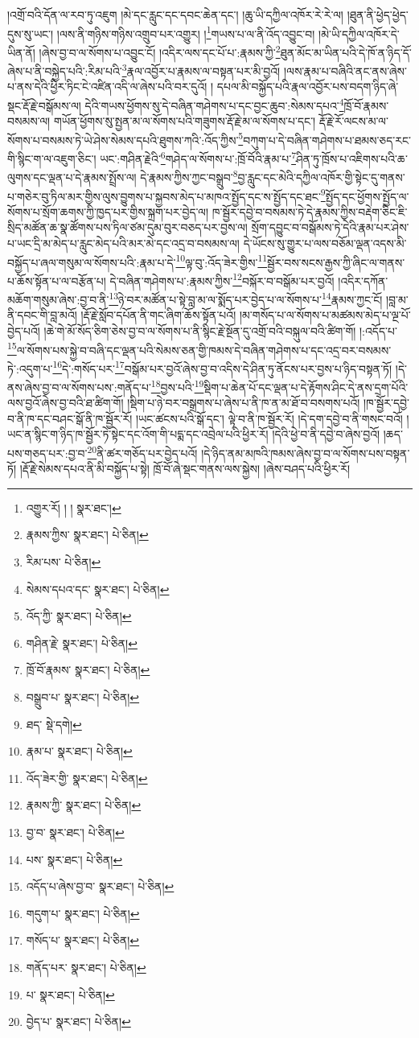 །འགྲོ་བའི་དོན་ལ་རབ་ཏུ་འཇུག །མེ་དང་རླུང་དང་དབང་ཆེན་དང་། །ཆུ་ཡི་དཀྱིལ་འཁོར་རེ་རེ་ལ། །ཐུན་ནི་ཕྱེད་ཕྱེད་དུས་སུ་ཡང་། །ལས་ནི་གཉིས་གཉིས་འགྲུབ་པར་འགྱུར། །\footnote{འགྱུར་རོ། ། །  སྣར་ཐང་། }གཡས་པ་ལ་ནི་འོད་འབྱུང་བ། །མེ་ཡི་དཀྱིལ་འཁོར་དེ་ཡིན་ནོ། །ཞེས་བྱ་བ་ལ་སོགས་པ་འབྱུང་ངོ། །འདིར་ལས་དང་པོ་པ་:རྣམས་ཀྱི་\footnote{རྣམས་ཀྱིས་  སྣར་ཐང་།  པེ་ཅིན། }ཐུན་མོང་མ་ཡིན་པའི་དེ་ཁོ་ན་ཉིད་དོ་ཞེས་པ་ནི་བསྐྱེད་པའི་:རིམ་པའི་\footnote{རིམ་པས་  པེ་ཅིན། }རྣལ་འབྱོར་པ་རྣམས་ལ་བསྟན་པར་མི་བྱའོ། །ལས་རྣམ་པ་བཞིའི་ནང་ནས་ཞེས་པ་ནས་དེའི་ཕྱིར་ཏིང་ངེ་འཛིན་འདི་ལ་ཞེས་པའི་བར་དུའོ། །
དཔལ་མི་བསྐྱོད་པའི་རྣལ་འབྱོར་པས་བདག་ཉིད་ཞེ་སྡང་རྡོ་རྗེ་བསྒོམས་ལ། དེའི་གཡས་ཕྱོགས་སུ་དེ་བཞིན་གཤེགས་པ་དང་བྱང་ཆུབ་:སེམས་དཔའ་\footnote{སེམས་དཔའ་དང་  སྣར་ཐང་།  པེ་ཅིན། }ཁྲོ་བོ་རྣམས་བསམས་ལ། གཡོན་ཕྱོགས་སུ་སྤྱན་མ་ལ་སོགས་པའི་གཟུགས་རྡོ་རྗེ་མ་ལ་སོགས་པ་དང་། རྡོ་རྗེ་རོ་ལངས་མ་ལ་སོགས་པ་བསམས་ཏེ་ཡེ་ཤེས་སེམས་དཔའི་ཐུགས་ཀའི་:འོད་ཀྱིས་\footnote{འོད་ཀྱི་  སྣར་ཐང་།  པེ་ཅིན། }བཀུག་པ་དེ་བཞིན་གཤེགས་པ་ཐམས་ཅད་རང་གི་སྙིང་ག་ལ་འཇུག་ཅིང་། ཡང་:གཤིན་རྗེའི་\footnote{གཤིན་རྗེ་  སྣར་ཐང་།  པེ་ཅིན། }གཤེད་ལ་སོགས་པ་:ཁྲོ་བོའི་རྣམ་པ་\footnote{ཁྲོ་བོ་རྣམས་  སྣར་ཐང་།  པེ་ཅིན། }ཤིན་ཏུ་ཁྲོས་པ་འཇིགས་པའི་ཆ་ལུགས་དང་ལྡན་པ་དེ་རྣམས་སྤྲོས་ལ། དེ་རྣམས་ཀྱིས་ཀྱང་བསྒྲུབ་\footnote{བསྒྲུབ་པ་  སྣར་ཐང་།  པེ་ཅིན། }བྱ་རླུང་དང་མེའི་དཀྱིལ་འཁོར་གྱི་སྟེང་དུ་གནས་པ་གཅེར་བུ་ཏིལ་མར་གྱིས་ལུས་བྱུགས་པ་སྐྱབས་མེད་པ་མཁའ་སྤྱོད་དང་ས་སྤྱོད་དང་ཐང་\footnote{ཐད་  སྡེ་དགེ། }སྤྱོད་དང་ཕྱོགས་སྤྱོད་ལ་སོགས་པ་སྲོག་ཆགས་ཀྱི་ཁྱད་པར་གྱིས་སྐྲག་པར་བྱེད་ལ། ཁ་སྦྱོར་དབྱེ་བ་བསམས་ཏེ་དེ་རྣམས་ཀྱིས་བརྡེག་ཅིང་ཇི་སྲིད་མཚོན་ཆ་སྣ་ཚོགས་པས་ཏིལ་ཙམ་དུམ་བུར་བཅད་པར་བྱས་ལ། སྲོག་དབྱུང་བ་བསྒོམས་ཏེ་དེའི་རྣམ་པར་ཤེས་པ་ཡང་དྲི་མ་མེད་པ་རླུང་མེད་པའི་མར་མེ་དང་འདྲ་བ་བསམས་ལ། དེ་ཡོངས་སུ་གྱུར་པ་ལས་བཅོམ་ལྡན་འདས་མི་བསྐྱོད་པ་ཞལ་གསུམ་ལ་སོགས་པའི་:རྣམ་པ་དེ་\footnote{རྣམ་པ་  སྣར་ཐང་།  པེ་ཅིན། }ལྟ་བུ་:འོད་ཟེར་གྱིས་\footnote{འོད་ཟེར་གྱི་  སྣར་ཐང་།  པེ་ཅིན། }སྦྱོར་བས་སངས་རྒྱས་ཀྱི་ཞིང་ལ་གནས་པ་ཆོས་སྟོན་པ་ལ་བརྩོན་པ། དེ་བཞིན་གཤེགས་པ་:རྣམས་ཀྱིས་\footnote{རྣམས་ཀྱི་  སྣར་ཐང་།  པེ་ཅིན། }བསྐོར་བ་བསྒོམ་པར་བྱའོ། །འདིར་དཀོན་མཆོག་གསུམ་ཞེས་:བྱ་བ་ནི་\footnote{བྱ་བ་  སྣར་ཐང་།  པེ་ཅིན། }ཉེ་བར་མཚོན་པ་སྟེ་བླ་མ་ལ་སྨོད་པར་བྱེད་པ་ལ་སོགས་པ་\footnote{པས་  སྣར་ཐང་།  པེ་ཅིན། }རྣམས་ཀྱང་ངོ། །བླ་མ་ནི་དབང་གི་བླ་མའོ། །རྡོ་རྗེ་སློབ་དཔོན་ནི་གང་ཞིག་ཆོས་སྟོན་པའོ། །མ་གསོད་པ་ལ་སོགས་པ་མཚམས་མེད་པ་ལྔ་པོ་བྱེད་པའོ། །ཆེ་གེ་མོ་སོད་ཅིག་ཅེས་བྱ་བ་ལ་སོགས་པ་ནི་སྙིང་རྗེ་སྔོན་དུ་འགྲོ་བའི་བསྐུལ་བའི་ཚིག་གོ། །:འདོད་པ་\footnote{འདོད་པ་ཞེས་བྱ་བ་  སྣར་ཐང་།  པེ་ཅིན། }ལ་སོགས་པས་སྐྱེ་བ་བཞི་དང་ལྡན་པའི་སེམས་ཅན་གྱི་ཁམས་དེ་བཞིན་གཤེགས་པ་དང་འདྲ་བར་བསམས་ཏེ་:འདུག་པ་\footnote{གདུག་པ་  སྣར་ཐང་།  པེ་ཅིན། }དེ་:གསོད་པར་\footnote{གསོད་པ་  སྣར་ཐང་།  པེ་ཅིན། }བསྒོམ་པར་བྱའོ་ཞེས་བྱ་བ་འདིས་དེ་ཤིན་ཏུ་ནོངས་པར་བྱས་པ་ཉིད་བསྟན་ཏོ། །དེ་ནས་ཞེས་བྱ་བ་ལ་སོགས་པས་:གནོད་པ་\footnote{གནོད་པར་  སྣར་ཐང་།  པེ་ཅིན། }བྱས་པའི་\footnote{པ་  སྣར་ཐང་།  པེ་ཅིན། }སྡིག་པ་ཆེན་པོ་དང་ལྡན་པ་དེ་རྟོགས་ཤིང་དེ་ནས་དྲག་པོའི་ལས་བྱའོ་ཞེས་བྱ་བའི་ཐ་ཚིག་གོ། །སྡིག་པ་ཉེ་བར་བསྒྲགས་པ་ཞེས་པ་ནི་ཁ་ན་མ་ཐོ་བ་བསགས་པའོ། །ཁ་སྦྱོར་དབྱེ་བ་ནི་ཁ་དང་བཤང་སྒོ་ནི་ཁ་སྦྱོར་རོ། །ཡང་ཚངས་པའི་སྒོ་དང་། ལྟེ་བ་ནི་ཁ་སྦྱོར་རོ། །དེ་དག་དབྱེ་བ་ནི་གསང་བའོ། །ཡང་ན་སྙིང་ག་ཉིད་ཁ་སྦྱོར་ཏེ་སྟེང་དང་འོག་གི་པདྨ་དང་འབྲེལ་པའི་ཕྱིར་རོ། །དེའི་ཕྱེ་བ་ནི་དབྱེ་བ་ཞེས་བྱའོ། །ཆད་པས་གཅད་པར་:བྱ་བ་\footnote{བྱེད་པ་  སྣར་ཐང་།  པེ་ཅིན། }ནི་ཚར་གཅོད་པར་བྱེད་པའོ། །དེ་ཉིད་ནམ་མཁའི་ཁམས་ཞེས་བྱ་བ་ལ་སོགས་པས་བསྟན་ཏོ། །རྡོ་རྗེ་སེམས་དཔའ་ནི་མི་བསྐྱོད་པ་སྟེ། ཁྲོ་བོ་ཞེ་སྡང་གནས་ལས་སྐྱེས། །ཞེས་བཤད་པའི་ཕྱིར་རོ། 